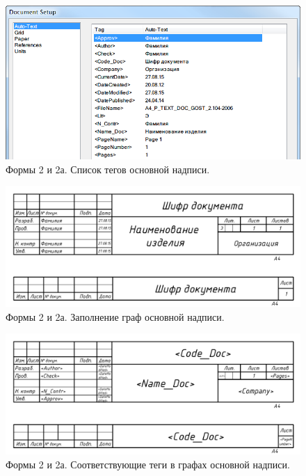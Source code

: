 \documentclass[14pt]{extreport}
\begin{document}
\begin{figure}[h]
	\centering
	\includegraphics[width=\textwidth]{ESKD_TEXT_DOC}
    \caption{Формы 2 и 2а. Список тегов основной надписи.\label{ESKD_TEXT_DOC}}
\end{figure}

\begin{figure}[h]
	\centering
	\includegraphics[width=\textwidth]{ESKD_TEXT_DOC_without_tagname}
	\caption{Формы 2 и 2а. Заполнение граф основной надписи.\label{ESKD_TEXT_DOC_without_tagname}}
\end{figure}

\begin{figure}[h]
	\centering
	\includegraphics[width=\textwidth]{ESKD_TEXT_DOC_with_tagname}
    \caption{Формы 2 и 2а. Соответствующие теги в графах основной надписи.\label{ESKD_TEXT_DOC_with_tagname}}
\end{figure}
\end{document}
